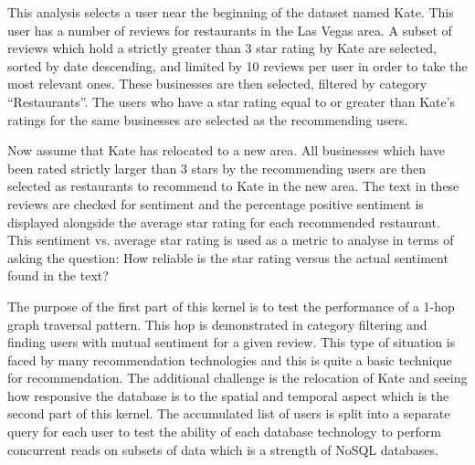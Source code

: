 




This analysis selects a user near the beginning of the dataset named Kate. This user has a number of reviews for restaurants in the Las Vegas area. A subset of reviews which hold a strictly greater than 3 star rating by Kate are selected, sorted by date descending, and limited by 10 reviews per user in order to take the most relevant ones. These businesses are then selected, filtered by category ``Restaurants''. The users who have a star rating equal to or greater than Kate's ratings for the same businesses are selected as the recommending users.

Now assume that Kate has relocated to a new area. All businesses which have been rated strictly larger than 3 stars by the recommending users are then selected as restaurants to recommend to Kate in the new area. The text in these reviews are checked for sentiment and the percentage positive sentiment is displayed alongside the average star rating for each recommended restaurant. This sentiment vs. average star rating is used as a metric to analyse in terms of asking the question: How reliable is the star rating versus the actual sentiment found in the text?

The purpose of the first part of this kernel is to test the performance of a 1-hop graph traversal pattern. This hop is demonstrated in category filtering and finding users with mutual sentiment for a given review. This type of situation is faced by many recommendation technologies and this is quite a basic technique for recommendation. The additional challenge is the relocation of Kate and seeing how responsive the database is to the spatial and temporal aspect which is the second part of this kernel. The accumulated list of users is split into a separate query for each user to test the ability of each database technology to perform concurrent reads on subsets of data which is a strength of NoSQL databases.

